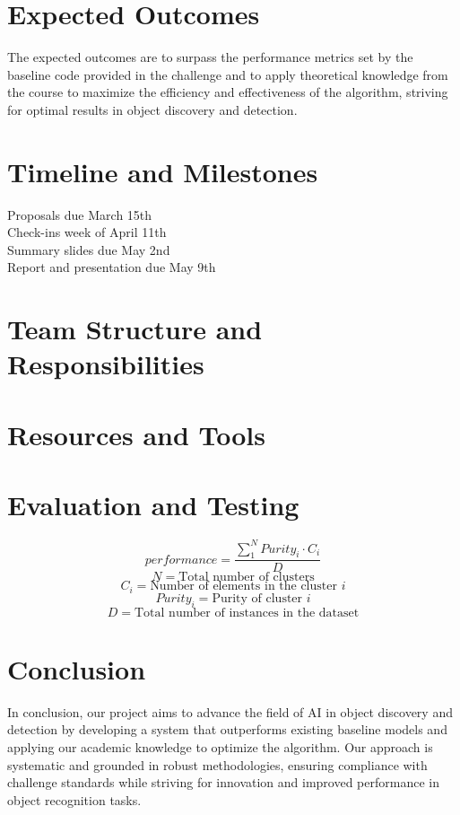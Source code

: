\documentclass{article}
\begin{document}
	
	\section{Expected Outcomes}
	
	
	The expected outcomes are to surpass the performance metrics set by the baseline code provided in the challenge and to apply theoretical knowledge from the course to maximize the efficiency and effectiveness of the algorithm, striving for optimal results in object discovery and detection.
	
	
	\section{Timeline and Milestones}
	Proposals due March 15th\\
	Check-ins week of April 11th\\
	Summary slides due May 2nd\\
	Report and presentation due May 9th\\
	
	\section{Team Structure and Responsibilities}
	
	\section{Resources and Tools}
	
	\section{Evaluation and Testing}
	$$performance = \frac{\sum_{1}^{N}Purity_{i} \cdot C_{i}}{D}$$
	$$N = \textrm{Total number of clusters}$$
	$$C_{i} = \textrm{Number of elements in the cluster } i$$
	$$Purity_{i} = \textrm{Purity of cluster } i$$
	$$D = \textrm{Total number of instances in the dataset}$$
	
	\section{Conclusion}
	In conclusion, our project aims to advance the field of AI in object discovery and detection by developing a system that outperforms existing baseline models and applying our academic knowledge to optimize the algorithm. Our approach is systematic and grounded in robust methodologies, ensuring compliance with challenge standards while striving for innovation and improved performance in object recognition tasks.
	
\end{document}
